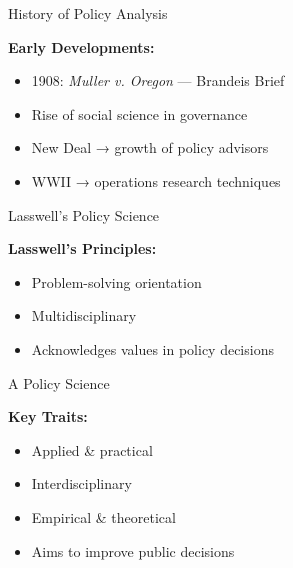 \documentclass[10pt]{beamer}
\begin{document}
\begin{frame}{History of Policy Analysis}

\begin{block}{}
    \textbf{Early Developments:}
    \begin{itemize}
        \item 1908: \textit{Muller v. Oregon} — Brandeis Brief
        \item Rise of social science in governance
        \item New Deal → growth of policy advisors
        \item WWII → operations research techniques
    \end{itemize}
\end{block}

\end{frame}


\begin{frame}{Lasswell’s Policy Science}

\begin{block}{}
    \textbf{Lasswell's Principles:}
    \begin{itemize}
        \item Problem-solving orientation
        \item Multidisciplinary
        \item Acknowledges values in policy decisions
    \end{itemize}

    \vspace{0.5em}
\end{block}

\end{frame}


\begin{frame}{A Policy Science}

\begin{block}{}
    \textbf{Key Traits:}
    \begin{itemize}
        \item Applied \& practical
        \item Interdisciplinary
        \item Empirical \& theoretical
        \item Aims to improve public decisions
    \end{itemize}
\end{block}

\end{frame}
\end{document}
